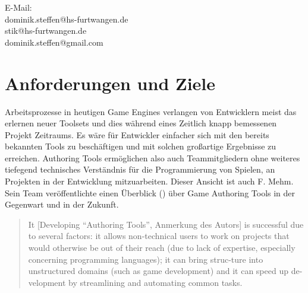 \documentclass[pagesize, paper=a4, fontsize=12pt,titlepage=true, headings=small, headnosepline, abstractoff, liststotoc, nochapterprefix, plainheadsepline, twoside]{scrreprt}
\begin{document}
E-Mail:\\
dominik.steffen@hs-furtwangen.de\\
stik@hs-furtwangen.de\\
dominik.steffen@gmail.com\\
\endgroup
\newpage
\thispagestyle{empty}
\mbox{}

\begingroup
	\clearpage
	\renewcommand*{\chapterpagestyle}{empty}
	\pagestyle{empty}
	\tableofcontents
	\clearpage
\endgroup
\newpage
\thispagestyle{empty}
\mbox{}


\renewcommand*{\chapterpagestyle}{plain}
\pagestyle{plain}
\setcounter{page}{0}

\chapter{Anforderungen und Ziele}
Arbeitsprozesse in heutigen Game Engines verlangen von Entwicklern meist das erlernen neuer Toolsets und dies während eines Zeitlich knapp bemessenen Projekt Zeitraums. Es wäre für Entwickler einfacher sich mit den bereits bekannten Tools zu beschäftigen und mit solchen großartige Ergebnisse zu erreichen. Authoring Tools ermöglichen  also auch Teammitgliedern ohne weiteres tiefegend technisches Verständnis für die Programmierung von Spielen, an Projekten in der Entwicklung mitzuarbeiten. Dieser Ansicht ist auch F. Mehm. Sein Team veröffentlichte einen Überblick () über Game Authoring Tools in der Gegenwart und in der Zukunft. 

\begin{quote}
It [Developing “Authoring Tools”, Anmerkung des Autors] is successful due to several factors: it allows non-technical users to work on projects that would otherwise be out of their reach (due to lack of expertise, especially concerning programming languages); it can bring struc-ture into unstructured domains (such as game development) and it can speed up de-velopment by streamlining and automating common tasks. \cite {FutureTrendsGAT:2012}
\end{quote}
\end{document}
